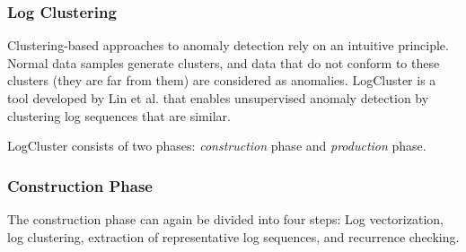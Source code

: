 \subsubsection{Log Clustering}
 \label{section:lrLogClustering}

Clustering-based approaches to anomaly detection rely on an intuitive principle. Normal data samples generate clusters, and data that do not conform to these clusters (they are far from them) are considered as anomalies. LogCluster is a tool developed by Lin et al. \cite{logCluster2016} that enables unsupervised anomaly detection by clustering log sequences that are similar. 

LogCluster consists of two phases: \textit{construction} phase and \textit{production} phase. 

\subsubsection*{ Construction Phase }
The construction phase can again be divided into four steps: Log vectorization, log clustering, extraction of representative log sequences, and recurrence checking.

